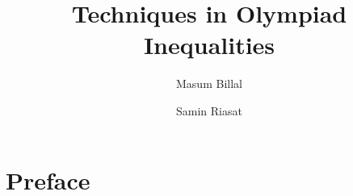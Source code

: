 \documentclass[a4paper, 12pt]{book}
\title{\bfseries Techniques in Olympiad Inequalities}
\author{Masum Billal\and Samin Riasat}
\begin{document}
	\frontmatter
	\maketitle
	\section*{Preface}
	\tableofcontents
	\mainmatter
	
	\begin{refsection}
		
		
		
		
		
		
		\printbibliography
	\end{refsection}
	
	\begin{refsection}
		
		\printbibliography
	\end{refsection}

	\begin{refsection}
		
		\printbibliography
	\end{refsection}

	\begin{refsection}
		
		\printbibliography
	\end{refsection}
	
	\begin{refsection}
		
		\printbibliography
	\end{refsection}

	\begin{refsection}
		
		\printbibliography
	\end{refsection}

	\begin{refsection}
		
		\printbibliography
	\end{refsection}
	
	\begin{refsection}
		
		\printbibliography
	\end{refsection}

	\begin{refsection}
		
		\printbibliography
	\end{refsection}

	\begin{refsection}
		
		\printbibliography
	\end{refsection}

	\begin{refsection}
		
		\printbibliography
	\end{refsection}

	\begin{refsection}
		
		\printbibliography
	\end{refsection}

	\begin{refsection}
		
		\printbibliography
	\end{refsection}

	\begin{refsection}
		
		\printbibliography
	\end{refsection}
	\backmatter
\end{document}
